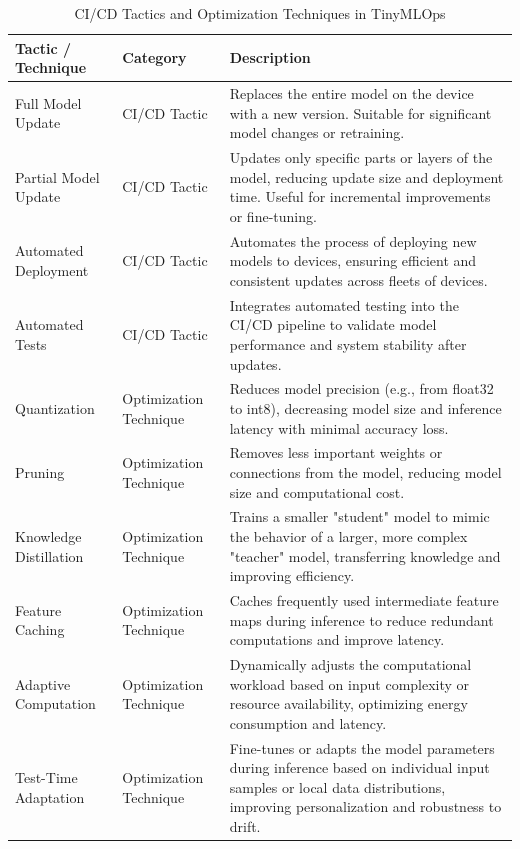 \begin{table}[htbp]
    \centering
    \caption{CI/CD Tactics and Optimization Techniques in TinyMLOps}
    \label{tab:cicd-optim-techniques}
    \begin{tabularx}{\textwidth}{l l X}
        \toprule
        \textbf{Tactic / Technique} & \textbf{Category} & \textbf{Description} \\
        \midrule
        Full Model Update & CI/CD Tactic & Replaces the entire model on the device with a new version. Suitable for significant model changes or retraining. \\
        \midrule
        Partial Model Update & CI/CD Tactic & Updates only specific parts or layers of the model, reducing update size and deployment time. Useful for incremental improvements or fine-tuning. \\
        \midrule
        Automated Deployment & CI/CD Tactic & Automates the process of deploying new models to devices, ensuring efficient and consistent updates across fleets of devices. \\
        \midrule
        Automated Tests & CI/CD Tactic & Integrates automated testing into the CI/CD pipeline to validate model performance and system stability after updates. \\
        \midrule
        Quantization & Optimization Technique & Reduces model precision (e.g., from float32 to int8), decreasing model size and inference latency with minimal accuracy loss. \\
        \midrule
        Pruning & Optimization Technique & Removes less important weights or connections from the model, reducing model size and computational cost. \\
        \midrule
        Knowledge Distillation & Optimization Technique & Trains a smaller "student" model to mimic the behavior of a larger, more complex "teacher" model, transferring knowledge and improving efficiency. \\
        \midrule
        Feature Caching & Optimization Technique & Caches frequently used intermediate feature maps during inference to reduce redundant computations and improve latency. \\
        \midrule
        Adaptive Computation & Optimization Technique & Dynamically adjusts the computational workload based on input complexity or resource availability, optimizing energy consumption and latency. \\
        \midrule
        Test-Time Adaptation & Optimization Technique & Fine-tunes or adapts the model parameters during inference based on individual input samples or local data distributions, improving personalization and robustness to drift. \\
        \bottomrule
    \end{tabularx}
\end{table}
\clearpage

